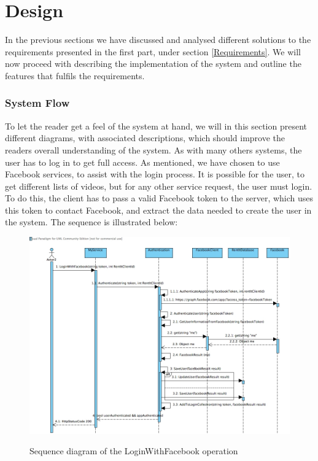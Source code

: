 \part{Design}
In the previous sections we have discussed and analysed different solutions to the requirements presented in the first part, under section \ref{Requirements}. We will now proceed with describing the implementation of the system and outline the features that fulfils the requirements.

\section{System Flow}
To let the reader get a feel of the system at hand, we will in this section present different diagrams, with associated descriptions, which should improve the readers overall understanding of the system.
As with many others systems, the user has to log in to get full access. As mentioned, we have chosen to use Facebook services, to assist with the login process. It is possible for the user, to get different lists of videos, but for any other service request, the user must login. To do this, the client has to pass a valid Facebook token to the server, which uses this token to contact Facebook, and extract the data needed to create the user in the system. The sequence is illustrated below:

\begin{figure}[H]
\centering
\includegraphics[scale=0.35]{loginWithFacebook.jpg}
\label{loginwithfacebook}
\caption{Sequence diagram of the LoginWithFacebook operation}
\end{figure}


